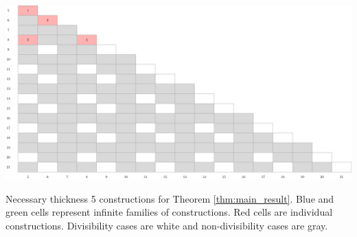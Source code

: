 \begin{table}[]
\centering
\includegraphics[width=\textwidth]{tables/2/thickness_5.pdf}
\caption{Necessary thickness 5 constructions for Theorem \ref{thm:main_result}. Blue and green cells represent infinite families of constructions. Red cells are individual constructions. Divisibility cases are white and non-divisibility cases are gray.}
\label{tab:integral_bounds_5}
\end{table}


